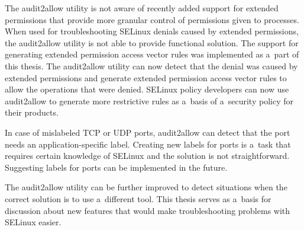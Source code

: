The audit2allow utility is not aware of recently added support for extended
permissions that provide more granular control of permissions given to
processes. When used for troubleshooting SELinux denials caused by extended
permissions, the audit2allow utility is not able to provide functional solution.
The support for generating extended permission access vector rules was
implemented as a~part of this thesis. The audit2allow utility can now detect
that the denial was caused by extended permissions and generate extended
permission access vector rules to allow the operations that were denied. SELinux
policy developers can now use audit2allow to generate more restrictive rules as
a~basis of a~security policy for their products.

In case of mislabeled TCP or UDP ports, audit2allow can detect that the port
needs an application-specific label. Creating new labels for ports is a~task
that requires certain knowledge of SELinux and the solution is not
straightforward. Suggesting labels for ports can be implemented in the future.


The audit2allow utility can be further improved to detect situations when the
correct solution is to use a~different tool. This thesis serves as a~basis for
discussion about new features that would make troubleshooting problems with
SELinux easier.
